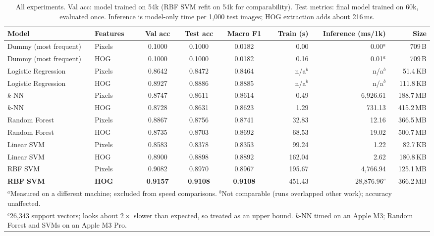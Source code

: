 \documentclass[conference]{IEEEtran}
\begin{document}
\begin{table}[t]
  \centering
  \caption{All experiments. Val acc: model trained on 54k (RBF SVM refit on 54k for comparability). Test metrics: final
  model trained on 60k, evaluated once. Inference is model-only time per 1,000 test images; HOG extraction adds about 216\,ms.}
  \label{tab:results}
  \begin{tabular}{l l c c c r r r}
    \toprule
    Model & Features & Val acc & Test acc & Macro F1 & Train (s) & Inference (ms/1k) & Size \\
    \midrule
    Dummy (most frequent) & Pixels & 0.1000 & 0.1000 & 0.0182 & 0.00 & 0.00$^{a}$ & 709\,B \\
    Dummy (most frequent) & HOG    & 0.1000 & 0.1000 & 0.0182 & 0.16 & 0.01$^{a}$ & 709\,B \\
    Logistic Regression & Pixels & 0.8642 & 0.8472 & 0.8464 & n/a$^{b}$ & n/a$^{b}$ & 51.4\,KB \\
    Logistic Regression & HOG    & 0.8927 & 0.8886 & 0.8885 & n/a$^{b}$ & n/a$^{b}$ & 111.8\,KB \\
    $k$-NN & Pixels & 0.8747 & 0.8611 & 0.8614 & 0.49 & 6,926.61 & 188.7\,MB \\
    $k$-NN & HOG    & 0.8728 & 0.8631 & 0.8623 & 1.29 & 731.13 & 415.2\,MB \\
    Random Forest & Pixels & 0.8867 & 0.8756 & 0.8741 & 32.83 & 12.16 & 366.5\,MB \\
    Random Forest & HOG    & 0.8735 & 0.8703 & 0.8692 & 68.53 & 19.02 & 500.7\,MB \\
    Linear SVM & Pixels & 0.8583 & 0.8378 & 0.8353 & 99.24 & 1.22 & 82.7\,KB \\
    Linear SVM & HOG    & 0.8900 & 0.8898 & 0.8892 & 162.04 & 2.62 & 180.8\,KB \\
    RBF SVM & Pixels & 0.9082 & 0.8970 & 0.8967 & 195.67 & 4,766.94 & 125.1\,MB \\
    \textbf{RBF SVM} & \textbf{HOG} & \textbf{0.9157} & \textbf{0.9108} & \textbf{0.9108} & 451.43 & 28,876.96$^{c}$ & 366.2\,MB \\
    \bottomrule
    \multicolumn{8}{l}{\footnotesize $^{a}$Measured on a different machine; excluded from speed comparisons.
    $^{b}$Not comparable (runs overlapped other work); accuracy unaffected.}\\
    \multicolumn{8}{l}{\footnotesize $^{c}$26,343 support vectors; looks about $2\times$ slower than expected, so treated as an upper bound.
    $k$-NN timed on an Apple M3; Random Forest and SVMs on an Apple M3 Pro.}
  \end{tabular}
\end{table}
\end{document}
